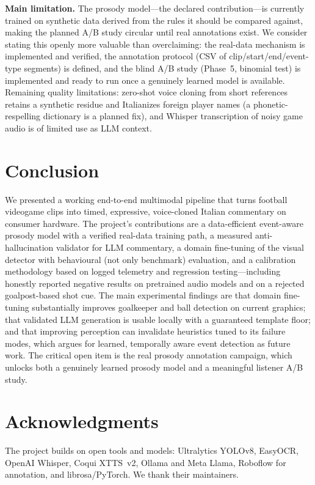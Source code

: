 \documentclass[10pt,twocolumn,a4paper]{article}
\begin{document}
	\textbf{Main limitation.} The prosody model---the declared contribution---is currently trained on synthetic data derived from the rules it should be compared against, making the planned A/B study circular until real annotations exist. We consider stating this openly more valuable than overclaiming: the real-data mechanism is implemented and verified, the annotation protocol (CSV of clip/start/end/event-type segments) is defined, and the blind A/B study (Phase~5, binomial test) is implemented and ready to run once a genuinely learned model is available. Remaining quality limitations: zero-shot voice cloning from short references retains a synthetic residue and Italianizes foreign player names (a phonetic-respelling dictionary is a planned fix), and Whisper transcription of noisy game audio is of limited use as LLM context.

	\section{Conclusion}

	We presented a working end-to-end multimodal pipeline that turns football videogame clips into timed, expressive, voice-cloned Italian commentary on consumer hardware. The project's contributions are a data-efficient event-aware prosody model with a verified real-data training path, a measured anti-hallucination validator for LLM commentary, a domain fine-tuning of the visual detector with behavioural (not only benchmark) evaluation, and a calibration methodology based on logged telemetry and regression testing---including honestly reported negative results on pretrained audio models and on a rejected goalpost-based shot cue. The main experimental findings are that domain fine-tuning substantially improves goalkeeper and ball detection on current graphics; that validated LLM generation is usable locally with a guaranteed template floor; and that improving perception can invalidate heuristics tuned to its failure modes, which argues for learned, temporally aware event detection as future work. The critical open item is the real prosody annotation campaign, which unlocks both a genuinely learned prosody model and a meaningful listener A/B study.

	\section*{Acknowledgments}

	The project builds on open tools and models: Ultralytics YOLOv8, EasyOCR, OpenAI Whisper, Coqui XTTS~v2, Ollama and Meta Llama, Roboflow for annotation, and librosa/PyTorch. We thank their maintainers.
\end{document}
